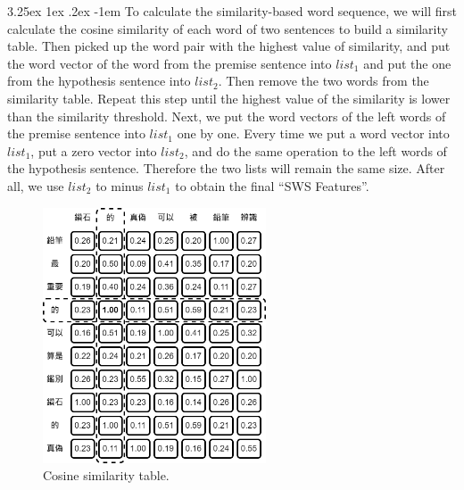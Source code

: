 \documentclass[12pt]{article}
\makeatletter
\renewcommand\paragraph{\@startsection{paragraph}{5}{\z@}%
  {3.25ex \@plus1ex \@minus.2ex}%
  {-1em}%
  {\normalfont\normalsize\bfseries}}
\makeatother
\begin{document}
\begin{CJK*}{UTF8}{bkai}
\begin{spacing}{1.77}

\paragraph{}
To calculate the similarity-based word sequence, we will first calculate the cosine similarity of each word of two sentences to build a similarity table. Then picked up the word pair with the highest value of similarity, and put the word vector of the word from the premise sentence into $list_1$ and put the one from the hypothesis sentence into $list_2$. Then remove the two words from the similarity table. Repeat this step until the highest value of the similarity is lower than the similarity threshold. Next, we put the word vectors of the left words of the premise sentence into $list_1$ one by one. Every time we put a word vector into $list_1$, put a zero vector into $list_2$, and do the same operation to the left words of the hypothesis sentence. Therefore the two lists will remain the same size. After all, we use $list_2$ to minus $list_1$ to obtain the final ``SWS Features''.

\begin{figure}[H]
  \centering
  \includegraphics[width=250px]{WAG.png}
  \caption[Cosine Similarity Table]{Cosine similarity table.}
  \label{fig:csa}
\end{figure}


\end{spacing}
\end{CJK*}
\end{document}
